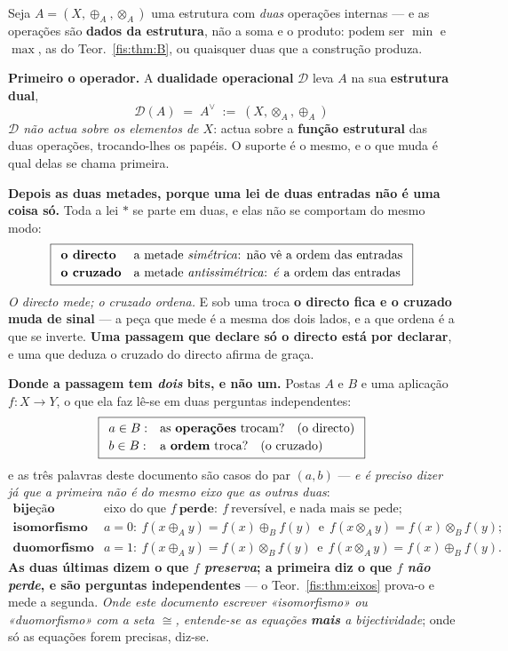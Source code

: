 \documentclass[livro.tex]{subfiles}
\begin{document}
\begin{definicao}\label{fis:def:duomorf}
Seja $A=(X,\oplus_A,\otimes_A)$ uma estrutura com \emph{duas} operações internas
--- e as operações são \textbf{dados da estrutura}, não a soma e o produto:
podem ser $\min$ e $\max$, as do Teor.~\ref{fis:thm:B}, ou quaisquer duas que a
construção produza.

\medskip\noindent\textbf{Primeiro o operador.} A \textbf{dualidade operacional}
$\mathcal{D}$ leva $A$ na sua \textbf{estrutura dual},
\[
\boxed{\;\mathcal{D}(A)\;=\;A^{\vee}\;:=\;(X,\otimes_A,\oplus_A)\;}
\]
\emph{$\mathcal{D}$ não actua sobre os elementos de $X$}: actua sobre a
\textbf{função estrutural} das duas operações, trocando-lhes os papéis. O suporte
é o mesmo, e o que muda é qual delas se chama primeira.

\medskip\noindent\textbf{Depois as duas metades, porque uma lei de duas entradas
não é uma coisa só.} Toda a lei $\ast$ se parte em duas, e elas não se comportam
do mesmo modo:
\[
\boxed{
\begin{array}{ll}
\textbf{o directo} & \text{a metade \emph{simétrica}: não vê a ordem das entradas}\\[2pt]
\textbf{o cruzado} & \text{a metade \emph{antissimétrica}: \emph{é} a ordem das entradas}
\end{array}}
\]
\emph{O directo mede; o cruzado ordena.} E sob uma troca \textbf{o directo fica e o
cruzado muda de sinal} --- a peça que mede é a mesma dos dois lados, e a que
ordena é a que se inverte. \textbf{Uma passagem que declare só o directo está
por declarar}, e uma que deduza o cruzado do directo afirma de graça.

\medskip\noindent\textbf{Donde a passagem tem \emph{dois} bits, e não um.} Postas
$A$ e $B$ e uma aplicação $f\colon X\to Y$, o que ela faz lê-se em duas
perguntas independentes:
\[
\boxed{
\begin{array}{ll}
a\in B: & \text{as \textbf{operações} trocam?}\quad(\text{o directo})\\[2pt]
b\in B: & \text{a \textbf{ordem} troca?}\quad(\text{o cruzado})
\end{array}}
\]
e as três palavras deste documento são casos do par $(a,b)$ --- \emph{e é preciso
dizer já que a primeira não é do mesmo eixo que as outras duas}:
\[
\begin{array}{ll}
\textbf{bijeção} & \text{eixo do que }f\ \textbf{perde}:\ f\ \text{reversível, e nada mais se pede;}\\[3pt]
\textbf{isomorfismo} & a=0:\ f(x\oplus_A y)=f(x)\oplus_B f(y)\ \ \text{e}\ \ f(x\otimes_A y)=f(x)\otimes_B f(y);\\[3pt]
\textbf{duomorfismo} & a=1:\ f(x\oplus_A y)=f(x)\otimes_B f(y)\ \ \text{e}\ \ f(x\otimes_A y)=f(x)\oplus_B f(y).
\end{array}
\]
\textbf{As duas últimas dizem o que $f$ \emph{preserva}; a primeira diz o que $f$
\emph{não perde}, e são perguntas independentes} --- o Teor.~\ref{fis:thm:eixos}
prova-o e mede a segunda. \emph{Onde este documento escrever «isomorfismo» ou
«duomorfismo» com a seta $\cong$, entende-se as equações \textbf{mais} a
bijectividade}; onde só as equações forem precisas, diz-se.


\end{definicao}
\end{document}
